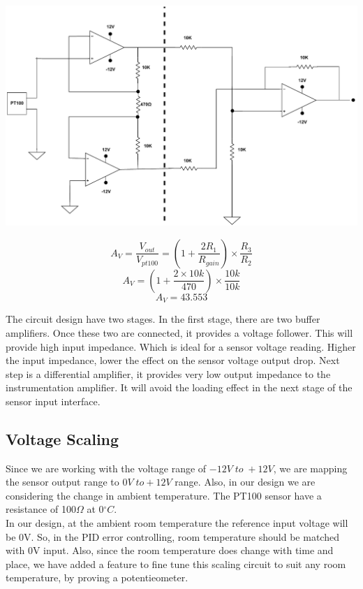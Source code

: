 \begin{multicols}{2}
\begin{minipage}{0.45\textwidth}
\centering
\includegraphics[width=\textwidth]{Method/ins.pdf}
\end{minipage}

$$A_V=\frac{V_{out}}{V_{pt100}}=(1+ \frac{2R_1}{R_{gain}})\times \frac{R_3}{R_2}$$
$$ A_V = (1+ \frac{2\times 10k}{470})\times \frac{10k}{10k}$$
$$A_V=43.553$$

The circuit design have two stages. In the first stage, there are two buffer amplifiers. Once these two are connected, it provides a voltage follower. This will provide high input impedance. Which is ideal for a sensor voltage reading. Higher the input impedance, lower the effect on the sensor voltage output drop. 
Next step is a differential amplifier, it provides very low output impedance to the instrumentation amplifier. It will avoid the loading effect in the next stage of the sensor input interface.



\subsection{Voltage Scaling}
Since we are working with the voltage range of $-12V \; to \; +12V$, we are mapping the sensor output range to $0V\; to +12V$ range. Also, in our design we are considering the change in ambient temperature. The PT100 sensor have a resistance of 100$ \Omega$ at 0$^\circ C$. \\
In our design, at the ambient room temperature the reference input voltage will be 0V. So, in the PID error controlling, room temperature should be matched with 0V input. Also, since the room temperature does change with time and place, we have added a feature to fine tune this scaling circuit to suit any room temperature, by proving a potentieometer.


\end{multicols}
